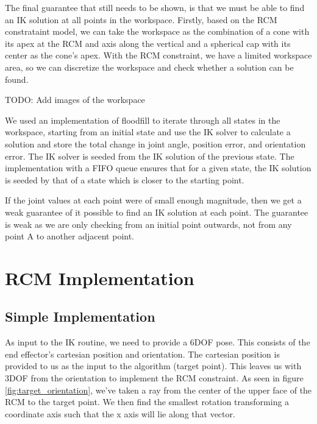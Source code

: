 \documentclass[BTech]{iitmdiss}
\begin{document}
    The final guarantee that still needs to be shown, is that we must be able to find an IK solution at all points in the workspace.
    Firstly, based on the RCM constrataint model, we can take the workspace as the combination of a cone with its apex at the RCM
    and axis along the vertical and a spherical cap with its center as the cone's apex.
    With the RCM constraint, we have a limited workspace area, so we can discretize the workspace and check whether a
    solution can be found.

    TODO: Add images of the workspace

    We used an implementation of floodfill to iterate through all states in the workspace, starting from an initial state
    and use the IK solver to calculate a solution and store the total change in joint angle, position error, and orientation error.
    The IK solver is seeded from the IK solution of the previous state.
    The implementation with a FIFO queue ensures that for a given state, the IK solution is seeded by that of a state which is closer to the starting point.

    If the joint values at each point were of small enough magnitude, then we get a weak guarantee of it possible to find an IK solution at each point.
    The guarantee is weak as we are only checking from an initial point outwards, not from any point A to another adjacent point.


    \section{RCM Implementation}

    \subsection{Simple Implementation}\label{subsec:simple-rcm-impl}

    As input to the IK routine, we need to provide a 6DOF pose.
    This consists of the end effector's cartesian position and orientation.
    The cartesian position is provided to us as the input to the algorithm (target point).
    This leaves us with 3DOF from the orientation to implement the RCM constraint.
    As seen in figure \ref{fig:target_orientation}, we've taken a ray from the center of the upper face of the RCM to the target point.
    We then find the smallest rotation transforming a coordinate axis such that the x axis will lie along that vector.
\end{document}
